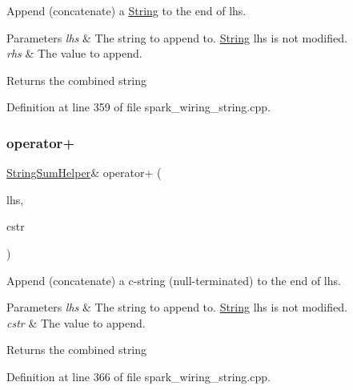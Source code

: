 Append (concatenate) a \hyperlink{class_string}{String} to the end of lhs. 


\begin{DoxyParams}{Parameters}
{\em lhs} & The string to append to. \hyperlink{class_string}{String} lhs is not modified.\\
\hline
{\em rhs} & The value to append.\\
\hline
\end{DoxyParams}
\begin{DoxyReturn}{Returns}
the combined string 
\end{DoxyReturn}


Definition at line 359 of file spark\+\_\+wiring\+\_\+string.\+cpp.

\mbox{\label{class_string_aa0fe70fca3cf4c9c3c1e77d2465a9bd9}} 
\subsubsection{\texorpdfstring{operator+}{operator+}\hspace{0.1cm}{\footnotesize\ttfamily [2/10]}}
{\footnotesize\ttfamily \hyperlink{class_string_sum_helper}{String\+Sum\+Helper}\& operator+ (\begin{DoxyParamCaption}\item[{const \hyperlink{class_string_sum_helper}{String\+Sum\+Helper} \&}]{lhs,  }\item[{const char $\ast$}]{cstr }\end{DoxyParamCaption})\hspace{0.3cm}{\ttfamily [friend]}}



Append (concatenate) a c-\/string (null-\/terminated) to the end of lhs. 


\begin{DoxyParams}{Parameters}
{\em lhs} & The string to append to. \hyperlink{class_string}{String} lhs is not modified.\\
\hline
{\em cstr} & The value to append.\\
\hline
\end{DoxyParams}
\begin{DoxyReturn}{Returns}
the combined string 
\end{DoxyReturn}


Definition at line 366 of file spark\+\_\+wiring\+\_\+string.\+cpp.

